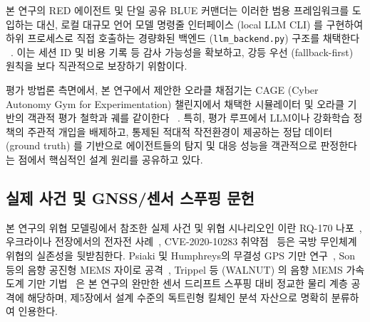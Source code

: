 본 연구의 RED 에이전트 및 단일 공유 BLUE 커맨더는 이러한 범용 프레임워크를 도입하는 대신, 로컬 대규모 언어 모델 명령줄 인터페이스 (local LLM CLI) 를 구현하여 하위 프로세스로 직접 호출하는 경량화된 백엔드 (\texttt{llm\_backend.py}) 구조를 채택한다 ~\cite{claude_code}. 이는 세션 ID 및 비용 기록 등 감사 가능성을 확보하고, 강등 우선 (fallback-first) 원칙을 보다 직관적으로 보장하기 위함이다.

평가 방법론 측면에서, 본 연구에서 제안한 오라클 채점기는 CAGE (Cyber Autonomy Gym for Experimentation) 챌린지에서 채택한 시뮬레이터 및 오라클 기반의 객관적 평가 철학과 궤를 같이한다 ~\cite{cage_challenge}. 특히, 평가 루프에서 LLM이나 강화학습 정책의 주관적 개입을 배제하고, 통제된 적대적 작전환경이 제공하는 정답 데이터 (ground truth) 를 기반으로 에이전트들의 탐지 및 대응 성능을 객관적으로 판정한다는 점에서 핵심적인 설계 원리를 공유하고 있다.

\subsection{실제 사건 및 GNSS/센서 스푸핑 문헌}

본 연구의 위협 모델링에서 참조한 실제 사건 및 위협 시나리오인 이란 RQ-170 나포~\cite{humphreys_testimony_2012}, 우크라이나 전장에서의 전자전 사례~\cite{rusi_russian_airwar_2022}, CVE-2020-10283 취약점~\cite{cve202010283} 등은 국방 무인체계 위협의 실존성을 뒷받침한다. Psiaki 및 Humphreys의 무결성 GPS 기만 연구~\cite{psiaki_humphreys_2016}, Son 등의 음향 공진형 MEMS 자이로 공격~\cite{son2015rocking}, Trippel 등 (WALNUT) 의 음향 MEMS 가속도계 기만 기법~\cite{trippel2017walnut} 은 본 연구의 완만한 센서 드리프트 스푸핑 대비 정교한 물리 계층 공격에 해당하며, 제5장에서 설계 수준의 독트린형 킬체인 분석 자산으로 명확히 분류하여 인용한다. 
